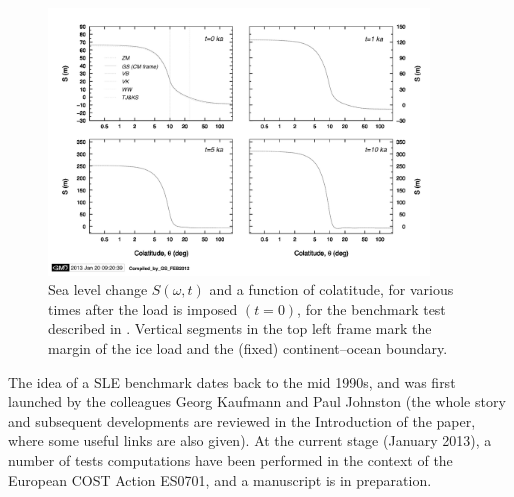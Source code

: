 \documentclass[11pt,fleqn,a4paper,titlepage]{article}
\begin{document}
\begin{figure}[!hbp] 
\begin{center}
\includegraphics[angle=0,width=0.9\textwidth]{./Figures/s-benchmark.png}
\vspace{0cm}
\caption[SLE benchmark]{\small{Sea level change $S(\omega,t)$ and a function of colatitude, for various times after the load is
imposed $(t=0)$, for the benchmark test described in \cite{Spada_etal_2011}. Vertical segments in the top left frame mark the margin 
of the ice load and the (fixed) continent--ocean boundary.}}
\label{fig:benchmark} 
\end{center} 
\end{figure}

The idea of a SLE benchmark dates back to the mid 1990s, and was first launched by the colleagues Georg Kaufmann and Paul Johnston (the whole story and subsequent developments are reviewed in the Introduction of the \citet{Spada_etal_2011} paper, where some useful links are also given). At the current stage (January 2013), a number of tests computations have been performed in the context of the European COST Action ES0701, and a manuscript is in preparation. 
\end{document}
